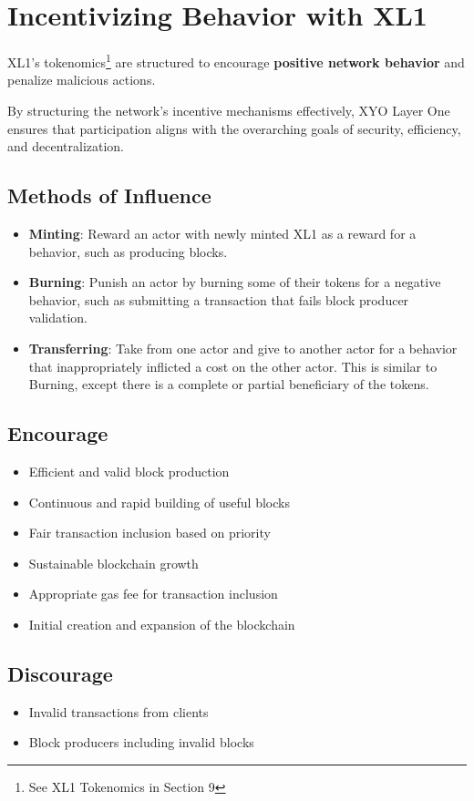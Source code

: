 \documentclass{article}
\begin{document}
\section{Incentivizing Behavior with XL1}
XL1’s tokenomics\footnote{See XL1 Tokenomics in Section 9} are structured to
encourage \textbf{positive network behavior} and penalize malicious actions.

By structuring the network's incentive mechanisms effectively, XYO Layer One
ensures that participation aligns with the overarching goals of security,
efficiency, and decentralization.

\subsection{Methods of Influence}
\begin{itemize}
    \item \textbf{Minting}: Reward an actor with newly minted XL1 as a reward for a behavior, such as producing blocks.
    \item \textbf{Burning}: Punish an actor by burning some of their tokens for a negative behavior, such as submitting a transaction that fails block producer validation.
    \item \textbf{Transferring}: Take from one actor and give to another actor for a behavior that inappropriately inflicted a cost on the other actor. This is similar to Burning, except there is a complete or partial beneficiary of the tokens.
\end{itemize}

\subsection{Encourage}
\begin{itemize}
    \item Efficient and valid block production
    \item Continuous and rapid building of useful blocks
    \item Fair transaction inclusion based on priority
    \item Sustainable blockchain growth
    \item Appropriate gas fee for transaction inclusion
    \item Initial creation and expansion of the blockchain
\end{itemize}

\subsection{Discourage}
\begin{itemize}
    \item Invalid transactions from clients
    \item Block producers including invalid blocks
\end{itemize}
\end{document}
